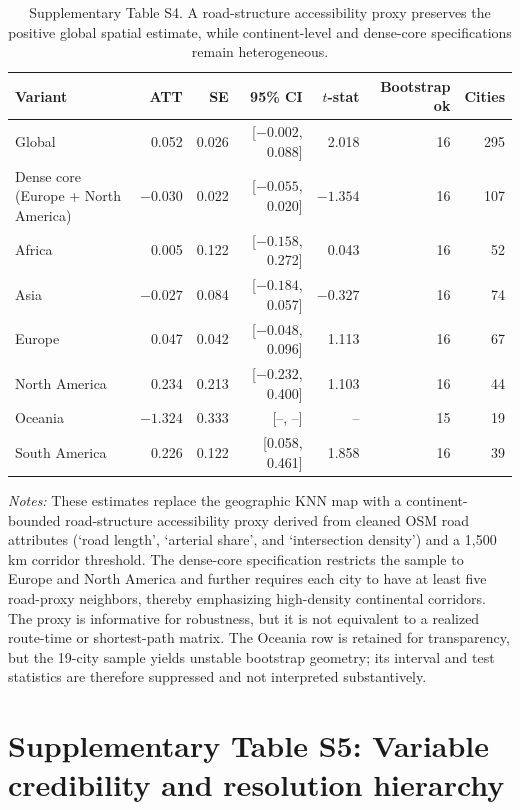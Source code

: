 \documentclass[oneside,pdflatex,sn-nature]{sn-jnl}
\begin{document}
\begin{table}[H]
\centering
\caption{Supplementary Table S4. A road-structure accessibility proxy preserves the positive global spatial estimate, while continent-level and dense-core specifications remain heterogeneous.}
\small
\setlength{\tabcolsep}{4pt}
\begin{tabular}{lrrrrrr}
\toprule
Variant & ATT & SE & 95\% CI & $t$-stat & Bootstrap ok & Cities \\
\midrule
Global & 0.052 & 0.026 & [$-0.002$, 0.088] & 2.018 & 16 & 295 \\
Dense core (Europe + North America) & $-0.030$ & 0.022 & [$-0.055$, 0.020] & $-1.354$ & 16 & 107 \\
Africa & 0.005 & 0.122 & [$-0.158$, 0.272] & 0.043 & 16 & 52 \\
Asia & $-0.027$ & 0.084 & [$-0.184$, 0.057] & $-0.327$ & 16 & 74 \\
Europe & 0.047 & 0.042 & [$-0.048$, 0.096] & 1.113 & 16 & 67 \\
North America & 0.234 & 0.213 & [$-0.232$, 0.400] & 1.103 & 16 & 44 \\
Oceania & $-1.324$ & 0.333 & [--, --] & -- & 15 & 19 \\
South America & 0.226 & 0.122 & [0.058, 0.461] & 1.858 & 16 & 39 \\
\bottomrule
\end{tabular}
\end{table}
\FloatBarrier

\noindent\textit{Notes:} These estimates replace the geographic KNN map with a continent-bounded road-structure accessibility proxy derived from cleaned OSM road attributes (`road length', `arterial share', and `intersection density') and a 1,500 km corridor threshold. The dense-core specification restricts the sample to Europe and North America and further requires each city to have at least five road-proxy neighbors, thereby emphasizing high-density continental corridors. The proxy is informative for robustness, but it is not equivalent to a realized route-time or shortest-path matrix. The Oceania row is retained for transparency, but the 19-city sample yields unstable bootstrap geometry; its interval and test statistics are therefore suppressed and not interpreted substantively.

\section{Supplementary Table S5: Variable credibility and resolution hierarchy}
\end{document}
